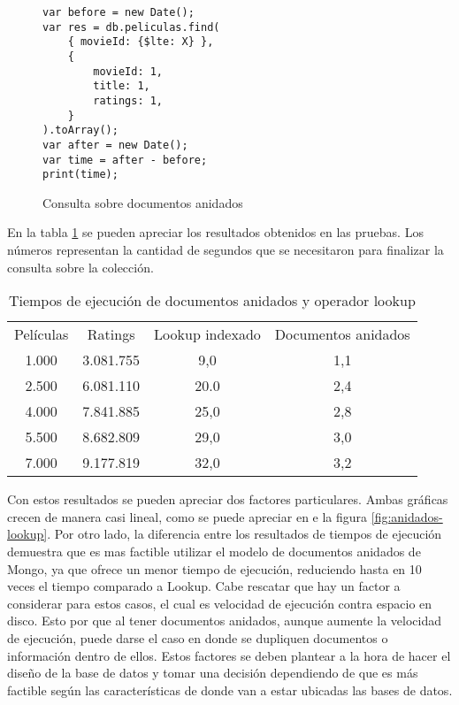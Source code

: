 \documentclass[conference,compsoc]{sty/IEEEtran}
\begin{document}
\begin{figure}
    \begin{verbatim}
var before = new Date();
var res = db.peliculas.find(
    { movieId: {$lte: X} }, 
    {
        movieId: 1,
        title: 1,
        ratings: 1,
    }
).toArray();
var after = new Date();
var time = after - before;
print(time);
\end{verbatim}
\caption{Consulta sobre documentos anidados} 
\label{fig:consulta-anidado}
\end{figure}

En la tabla \ref{table:2} se pueden apreciar los resultados obtenidos en las pruebas. Los números representan la cantidad de segundos que se necesitaron para finalizar la consulta sobre la colección. 

\begin{table}
\begin{center}
\begin{tabular}{ c c c c }
 Películas & Ratings & Lookup indexado & Documentos anidados \\ 
 1.000 & 3.081.755 & 9,0 & 1,1 \\  
 2.500 & 6.081.110 & 20.0 & 2,4 \\
 4.000 & 7.841.885 & 25,0 & 2,8 \\  
 5.500 & 8.682.809 & 29,0 & 3,0 \\
 7.000 & 9.177.819 & 32,0 & 3,2 \\
\end{tabular}
\end{center}
\caption{Tiempos de ejecución de documentos anidados y operador lookup}
\label{table:2}

\end{table}


Con estos resultados se pueden apreciar dos factores particulares. Ambas gráficas crecen de manera casi lineal, como se puede apreciar en e la figura \ref{fig:anidados-lookup}. Por otro lado, la diferencia entre los resultados de tiempos de ejecución demuestra que es mas factible utilizar el modelo de documentos anidados de Mongo, ya que ofrece un menor tiempo de ejecución, reduciendo hasta en 10 veces el tiempo comparado a Lookup. Cabe rescatar que hay un factor a considerar para estos casos, el cual es velocidad de ejecución contra espacio en disco. Esto por que al tener documentos anidados, aunque aumente la velocidad de ejecución, puede darse el caso en donde se dupliquen documentos o información dentro de ellos. Estos factores se deben plantear a la hora de hacer el diseño de la base de datos y tomar una decisión dependiendo de que es más factible según las características de donde van a estar ubicadas las bases de datos.  
\end{document}
